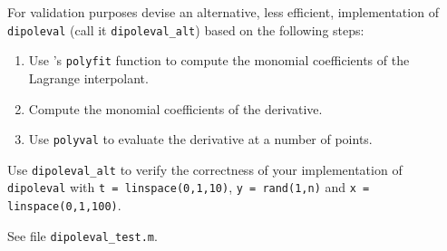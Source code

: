 \begin{problem}
\begin{subproblem}[2]
  For validation purposes devise an alternative, less efficient, implementation of
  \texttt{dipoleval} (call it \texttt{dipoleval\_alt}) based on the following
  steps:
  \begin{enumerate}
  \item Use \matlab{}'s \texttt{polyfit} function to compute the monomial
    coefficients of the Lagrange interpolant.
  \item Compute the monomial coefficients of the derivative.
  \item Use \texttt{polyval} to evaluate the derivative at a number of points.
  \end{enumerate}
  Use \texttt{dipoleval\_alt} to verify the correctness of your implementation of
  \texttt{dipoleval} with \texttt{t = linspace(0,1,10)}, \texttt{y = rand(1,n)}
  and \texttt{x = linspace(0,1,100)}.

\begin{solution}
See file \texttt{dipoleval\_test.m}.

% 
\end{solution}
\end{subproblem}
\end{problem}
